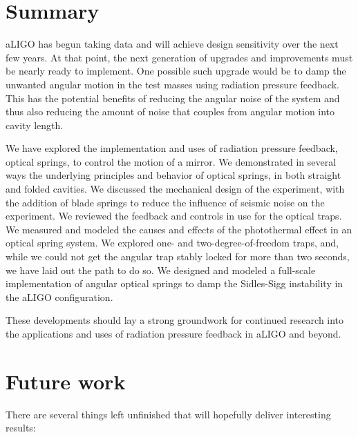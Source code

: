 \section{Summary}

aLIGO has begun taking data and will achieve design sensitivity over the next few years. At that point, the next generation of upgrades and improvements must be nearly ready to implement. One possible such upgrade would be to damp the unwanted angular motion in the test masses using radiation pressure feedback. This has the potential benefits of reducing the angular noise of the system and thus also reducing the amount of noise that couples from angular motion into cavity length.  
 
We have explored the implementation and uses of radiation pressure feedback, optical springs, to control the motion of a mirror. 
We demonstrated in several ways the underlying principles and behavior of optical springs, in both straight and folded cavities.
We discussed the mechanical design of the experiment, with the addition of blade springs to reduce the influence of seismic noise on the experiment.
We reviewed the feedback and controls in use for the optical traps. 
We measured and modeled the causes and effects of the photothermal effect in an optical spring system.
We explored one- and two-degree-of-freedom traps, and, while we could not get the angular trap stably locked for more than two seconds, we have laid out the path to do so.
We designed and modeled a full-scale implementation of angular optical springs to damp the Sidles-Sigg instability in the aLIGO configuration.

These developments should lay a strong groundwork for continued research into the applications and uses of radiation pressure feedback in aLIGO and beyond.

\section{Future work}

There are several things left unfinished that will hopefully deliver interesting results:

